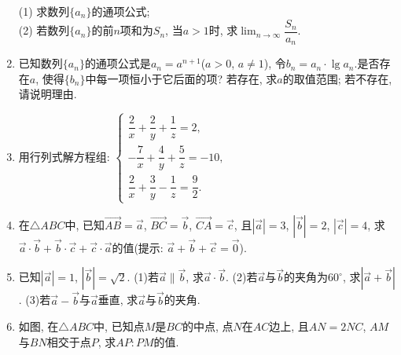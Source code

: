 \documentclass[10pt,a4paper]{article}
\begin{document}
\begin{enumerate}[1.]
(1) 求数列$\{a_n\}$的通项公式;\\
(2) 若数列$\{a_n\}$的前$n$项和为$S_n$, 当$a>1$时, 求$\displaystyle\lim_{n\to\infty}\dfrac{S_n}{a_n}$.
\item 已知数列$\{a_n\}$的通项公式是$a_n=a^{n+1}$($a>0$, $a\ne 1$), 令$b_n=a_n\cdot \lg a_n$.是否存在$a$, 使得$\{b_n\}$中每一项恒小于它后面的项? 若存在, 求$a$的取值范围; 若不存在, 请说明理由.
\item 用行列式解方程组: $\begin{cases}    \dfrac 2x+\dfrac 2y+\dfrac 1z=2,  \\-\dfrac 7x+\dfrac 4y+\dfrac 5z=-10,  \\\dfrac 2x+\dfrac 3y-\dfrac 1z=\dfrac 92.  \end{cases}$
\item 在$\triangle ABC$中, 已知$\overrightarrow{AB}=\overrightarrow a$, $\overrightarrow{BC}=\overrightarrow b$, $\overrightarrow{CA}=\overrightarrow c$, 且$|\overrightarrow a|=3$, $|\overrightarrow b|=2$, $|\overrightarrow c|=4$, 求$\overrightarrow a\cdot \overrightarrow b+\overrightarrow b\cdot \overrightarrow c+\overrightarrow c\cdot \overrightarrow a$的值(提示: $\overrightarrow a+\overrightarrow b+\overrightarrow c=\overrightarrow 0$).
\item 已知$|\overrightarrow a|=1$, $|\overrightarrow b|=\sqrt 2$.
(1)若$\overrightarrow a\parallel \overrightarrow b$, 求$\overrightarrow a\cdot \overrightarrow b$.
(2)若$\overrightarrow a$与$\overrightarrow b$的夹角为$60^{\circ }$, 求$|\overrightarrow a+\overrightarrow b|$.
(3)若$\overrightarrow a-\overrightarrow b$与$\overrightarrow a$垂直, 求$\overrightarrow a$与$\overrightarrow b$的夹角.
\item 如图, 在$\triangle ABC$中, 已知点$M$是$BC$的中点, 点$N$在$AC$边上, 且$AN=2NC$, $AM$与$BN$相交于点$P$, 求$AP:PM$的值.
\begin{center}
\end{center}

\end{enumerate}
\end{document}
